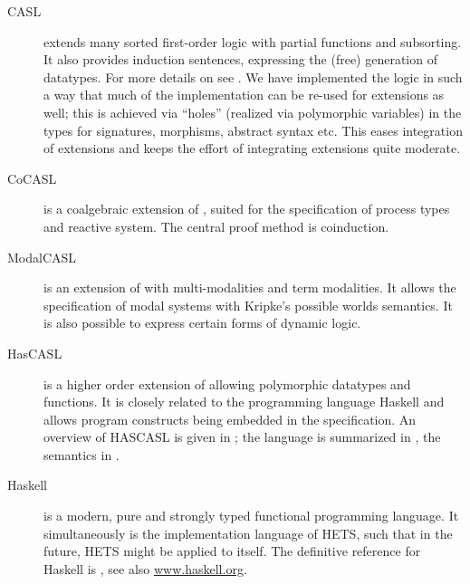 \documentclass{article}
\newcommand{\normalTEXTSC}[2]{{#1\scriptsize#2}}
\newcommand     {\Hets}{\normalTEXTSC{H}{ETS}\xspace}
\newcommand{\Dolce}{\textmd{\textsc{Dolce}}\xspace}
\newcommand     {\HasCASL}{\normalTEXTSC{H}{AS}\normalTEXTSC{C}{ASL}\xspace}
\begin{document}
\begin{description}
  
\item[CASL] extends many sorted first-order logic with partial
  functions and subsorting.  It also provides induction sentences,
  expressing the (free) generation of datatypes.
For more details on \CASL see \cite{CASL-RM,CASL-UM}.
%
We have implemented the \CASL logic in such a way that much of the
implementation can be re-used for \CASL extensions as well; this
is achieved via ``holes'' (realized via polymorphic variables) in the
types for signatures, morphisms, abstract syntax etc.  This eases
integration of \CASL extensions and keeps the effort of integrating
\CASL extensions quite moderate.

\item[CoCASL] \cite{MossakowskiEA04} is a coalgebraic extension of \CASL,
suited for the specification of process types and reactive system.
The central proof method is coinduction.

\item[ModalCASL] \cite{ModalCASL}
 is an extension of \CASL with multi-modalities and
term modalities. It allows the specification of modal systems with 
Kripke's possible worlds semantics. It is also possible to express
certain forms of dynamic logic. 

\item[HasCASL] is a higher order extension of \CASL allowing
  polymorphic datatypes and functions. It is closely related to the
  programming language Haskell and allows program constructs being
  embedded in the specification. 
  An overview of \HasCASL is given in \cite{Schroeder:2002:HIS};
the language is summarized in \cite{HasCASL/Summary}, the semantics
in \cite{Schroder05b,Schroder-habil}.

\item[Haskell] is a modern, pure and strongly typed functional
  programming language. It simultaneously is the implementation
  language of \Hets, such that in the future, \Hets might be applied
  to itself.
The definitive reference for Haskell is \cite{PeytonJones03},
see also \url{www.haskell.org}. 
  

\end{description}
\end{document}
